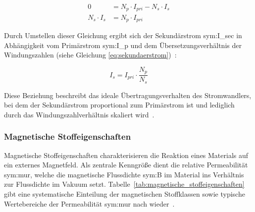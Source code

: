 \begin{align}
    0                 & = N_{p} \cdot I_{pri} - N_{s} \cdot I_{s} \nonumber \\[6pt]
    N_{s} \cdot I_{s} & = N_{p} \cdot I_{pri}
    \label{eq:ideales_gleichgewicht}
\end{align}

Durch Umstellen dieser Gleichung ergibt sich der Sekundärstrom \gls{sym:I_sec} in Abhängigkeit vom Primärstrom \gls{sym:I_p} und dem Übersetzungsverhältnis der Windungszahlen (siehe Gleichung \eqref{eq:sekundaerstrom})~\cite[S.~63]{book-Technologie_Messwandler-Minkner}:

\begin{equation}
    I_{s} = I_{pri} \cdot \frac{N_{p}}{N_{s}}
    \label{eq:sekundaerstrom}
\end{equation}

Diese Beziehung beschreibt das ideale Übertragungsverhalten des Stromwandlers, bei dem der Sekundärstrom proportional zum Primärstrom ist und lediglich durch das Windungszahlverhältnis skaliert wird~\cite[S.~63]{book-Technologie_Messwandler-Minkner}.

\subsubsection{Magnetische Stoffeigenschaften}
\label{sec:magnetische_stoffeigenschaften}

Magnetische Stoffeigenschaften charakterisieren die Reaktion eines Materials auf ein externes Magnetfeld. Als zentrale Kenngröße dient die relative Permeabilität \gls{sym:mur}, welche die magnetische Flussdichte \gls{sym:B} im Material ins Verhältnis zur Flussdichte im Vakuum setzt. Tabelle~\ref{tab:magnetische_stoffeigenschaften} gibt eine systematische Einteilung der magnetischen Stoffklassen sowie typische Wertebereiche der Permeabilität \gls{sym:mur} nach \cite[Tab.~48]{book-Taschenbuch_Physik-Kuchling} wieder~\cite[Kap.~11]{book-Magnetisches_Feld_Moeller-Harriehausen}\cite[Tab.~48]{book-Taschenbuch_Physik-Kuchling}.

